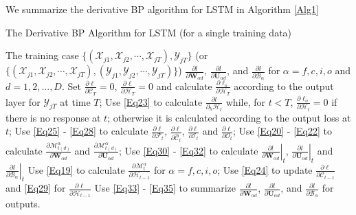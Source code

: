\documentclass[journal]{IEEEtran}
\renewcommand{\algorithmicrequire}{\textbf{Input:}}
\renewcommand{\algorithmicensure}{\textbf{Output:}}
\begin{document}
We summarize the derivative BP algorithm for LSTM in Algorithm \ref{Alg1}
\begin{algorithm}
\renewcommand{\algorithmicrequire}{\textbf{Input:}}
\renewcommand\algorithmicensure {\textbf{Output:} } 
\caption{The Derivative BP Algorithm for LSTM (for a single training data)} \label{Alg1}
\begin{algorithmic}[1]
  \REQUIRE The training case $\{(\mathcal{X}_{j1}, \mathcal{X}_{j2}, \cdots, \mathcal{X}_{jT}), \mathcal{Y}_{jT}\}$ (or $\{(\mathcal{X}_{j1}, \mathcal{X}_{j2}, \cdots, \mathcal{X}_{jT}), (\mathcal{Y}_{j1}, \mathcal{Y}_{j2}, \cdots, \mathcal{Y}_{jT})\}$)  
  \ENSURE $\frac{\partial l}{\partial \mathbf W_{\alpha d}}$, $\frac{\partial l}{\partial \mathbf U_{\alpha d}}$, and $\frac{\partial l}{\partial \mathcal{B}_{\alpha}}$ for $\alpha = f, c, i, o$ and $d=1, 2, ..., D$.
\STATE Set $\frac{\partial \ell}{\partial \mathcal{C}_T}=0$, $\frac{\partial \ell}{\partial \mathcal{H}_T}=0$ and calculate  $\frac{\partial \ell_o}{\partial \mathcal{H}_T}$ according to the output layer for $\mathcal{Y}_{jT}$ at time $T$; 
 \STATE Use \eqref{Eq23} to calculate $\frac{\partial l}{\partial_h\mathcal{H}_t}$ while, for $t<T$, $\frac{\partial \ell_o}{\partial \mathcal{H}_t} = 0$ if there is no response at $t$; otherwise it is calculated according to the output loss at $t$;
    \STATE Use \eqref{Eq25} - \eqref{Eq28} to calculate  $\frac{\partial \ell}{\partial \mathcal{F}_{t}}$,  $\frac{\partial \ell}{\partial \widehat{\mathcal{C}}_{t}}$, $\frac{\partial \ell}{\partial \mathcal{I}_{t}}$ and $\frac{\partial \ell}{\partial \mathcal{O}_{t}}$;
\STATE Use \eqref{Eq20} - \eqref{Eq22} to calculate $\frac{\partial \mathcal{M}^{\alpha}_{t(d)}}{\partial \mathbf W_{\alpha d}}$ and $\frac{\partial \mathcal{M}^{\alpha}_{t(d)}}{\partial \mathbf U_{\alpha d}}$;   
\STATE Use \eqref{Eq30} - \eqref{Eq32} to calculate $\left.\frac{\partial l}{\partial \mathbf W_{\alpha d}}\right|_{t}$, $\left.\frac{\partial l}{\partial \mathbf U_{\alpha d}}\right|_{t}$ and $\left.\frac{\partial l}{\partial \mathcal{B}_{\alpha }}\right|_{t}$
\STATE Use \eqref{Eq19} to calculate  $\frac{\partial \mathcal{M}^{\alpha}_t}{\partial \mathcal{H}_{t-1}}$ for $\alpha = f, c, i, o$;  
\STATE Use \eqref{Eq24} to update $\frac{\partial \ell}{\partial \mathcal{C}_{t-1}}$ and \eqref{Eq29} for $\frac{\partial \ell}{\partial \mathcal{H}_{t-1}}$
 \ENDFOR
\STATE Use \eqref{Eq33} - \eqref{Eq35} to summarize $\frac{\partial l}{\partial \mathbf W_{\alpha d}}$, $\frac{\partial l}{\partial \mathbf U_{\alpha d}}$, and $\frac{\partial l}{\partial \mathcal{B}_{\alpha}}$ for outputs.
\end{algorithmic}
\end{algorithm}
\end{document}
